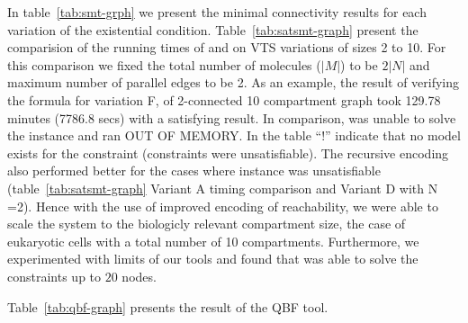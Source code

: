 In table~\ref{tab:smt-grph} we present the minimal connectivity results for each variation of the existential condition. 
%
Table~\ref{tab:satsmt-graph} present the comparision of the running times of {\smttool} and {\sattool} on VTS variations of sizes 2 to 10.
%
For this comparison we fixed the total number of molecules ($|M|$) to be $2|N|$ 
%
and maximum number of parallel
edges to be 2.
%
%
%
As an example, the result of verifying the formula for variation F, of 2-connected 10 compartment graph took 129.78 minutes (7786.8 secs) with a satisfying result.
%
In comparison, {\sattool} was unable to solve the instance and ran OUT OF MEMORY.
%
In the table ``!'' indicate that no model exists for the constraint  (constraints were unsatisfiable).
%
% 
The recursive encoding also performed better for the cases where instance was unsatisfiable (table~\ref{tab:satsmt-graph} Variant A timing comparison and Variant D with N =2).
%
Hence with the use of improved encoding of reachability, we were able to scale the system to the biologicly relevant compartment size, the
case of eukaryotic cells with a total number of 10 compartments.
%
Furthermore, we experimented with limits of our tools and found that {\smttool} was able to solve the constraints up to $20$ nodes.


Table~\ref{tab:qbf-graph} presents the result of the QBF tool.


